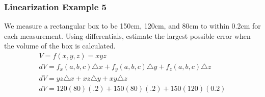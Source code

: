 \documentclass[12pt]{article}
\begin{document}
\subsubsection{Linearization Example 5}
We measure a rectangular box to be 150cm, 120cm, and 80cm to within 0.2cm for each measurement. Using differentials, estimate the largest possible error when the volume of the box is calculated.
\begin{align}
	V = f(x,y,z) = xyz \\
	dV = f_x(a,b,c)\triangle x + f_y(a,b,c) \triangle y + f_z(a,b,c) \triangle z\\
	dV = yz \triangle x + xz \triangle y + xy \triangle z \\
	dV = 120(80)(.2) + 150(80)(.2) + 150(120) (0.2) 
\end{align}
\fbox{
	\begin{minipage}{1in}
		\[
			dV = 7920
		\]
	\end{minipage}
}
\end{document}
